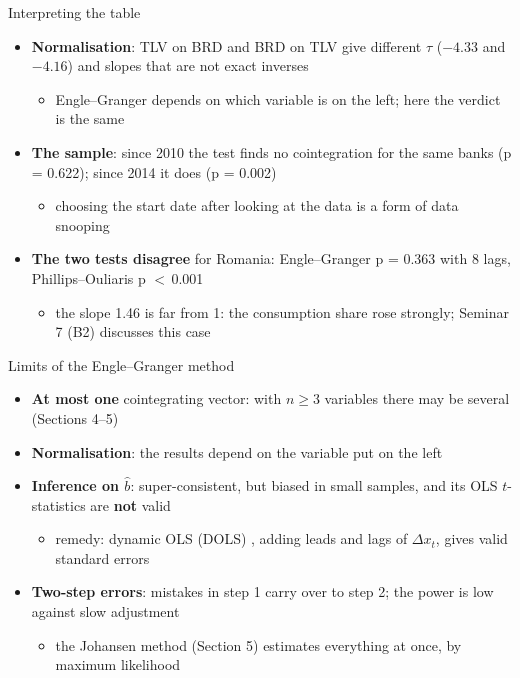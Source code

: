 \begin{frame}{Interpreting the table}
\itemsize{\small}
\begin{itemize}
    \item \textbf{Normalisation}: TLV on BRD and BRD on TLV give different $\tau$ ($-4.33$ and $-4.16$) and slopes that are not exact inverses
    \begin{itemize}
        \item Engle--Granger depends on which variable is on the left; here the verdict is the same
    \end{itemize}
    \item \textbf{The sample}: since 2010 the test finds no cointegration for the same banks (p = 0.622); since 2014 it does (p = 0.002)
    \begin{itemize}
        \item choosing the start date after looking at the data is a form of data snooping
    \end{itemize}
    \item \textbf{The two tests disagree} for Romania: Engle--Granger p = 0.363 with 8 lags, Phillips--Ouliaris p $<$\,0.001
    \begin{itemize}
        \item the slope 1.46 is far from 1: the consumption share rose strongly; Seminar 7 (B2) discusses this case
    \end{itemize}
\end{itemize}
\end{frame}

\begin{frame}{Limits of the Engle--Granger method}
\itemsize{\small}
\begin{itemize}
    \item \textbf{At most one} cointegrating vector: with $n \ge 3$ variables there may be several (Sections 4--5)
    \item \textbf{Normalisation}: the results depend on the variable put on the left
    \item \textbf{Inference on $\hat b$}: super-consistent, but biased in small samples, and its OLS $t$-statistics are \textbf{not} valid
    \begin{itemize}
        \item remedy: dynamic OLS (DOLS) , adding leads and lags of $\Delta x_t$, gives valid standard errors
    \end{itemize}
    \item \textbf{Two-step errors}: mistakes in step 1 carry over to step 2; the power is low against slow adjustment
    \begin{itemize}
        \item the Johansen method (Section 5) estimates everything at once, by maximum likelihood
    \end{itemize}
\end{itemize}
\end{frame}

